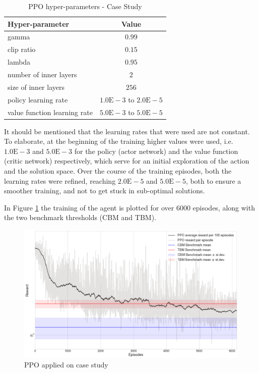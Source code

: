 \begin{table}[H]
    \centering
    \caption{\gls{PPO} hyper-parameters - Case Study}
    \label{ppoHyperCase}
    \begin{tabular}{lc}
        \toprule
        \textbf{Hyper-parameter} & \textbf{Value} \\ \midrule
        gamma & $0.99$ \\
        clip ratio & $0.15$ \\
        lambda & $0.95$ \\
        number of inner layers & $2$ \\
        size of inner layers & $256$ \\
        policy learning rate &  $1.0\mathrm{E}-3$ to $2.0\mathrm{E}-5$\\
        value function learning rate & $5.0\mathrm{E}-3$ to $5.0\mathrm{E}-5$ \\ \bottomrule
    \end{tabular}
\end{table}


It should be mentioned that the learning rates that were used are not constant. To elaborate, at the beginning of the training higher values were used, i.e. $1.0\mathrm{E}-3$ and $5.0\mathrm{E}-3$ for the policy (actor network) and the value function (critic network) respectively, which serve for an initial exploration of the action and the solution space. Over the course of the training episodes, both the learning rates were refined, reaching $2.0\mathrm{E}-5$ and $5.0\mathrm{E}-5$, both to ensure a smoother training, and not to get stuck in sub-optimal solutions.

\newpage

In Figure \ref{ppoCaseResults} the training of the agent is plotted for over $6000$ episodes, along with the two benchmark thresholds (\gls{CBM} and \gls{TBM}).

\begin{figure}[H]
    \centering
    \includegraphics[width=\textwidth]{Figures/24_6100_tbm_cbm_v2.png}
	\caption{\gls{PPO} applied on case study}
	\label{ppoCaseResults}
\end{figure}

